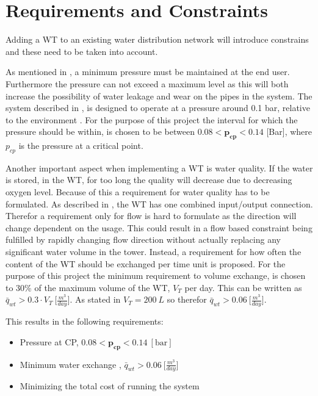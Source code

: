 \chapter{Requirements and Constraints}
\label{Requirements_and_constraints}

Adding a WT to an existing water distribution network will introduce constrains and these need to be taken into account. 

As mentioned in , a minimum pressure must be maintained at the end user. Furthermore the pressure can not exceed a maximum level as this will both increase the possibility of water leakage and wear on the pipes in the system. The system described in , is designed to operate at a pressure around 0.1 bar, relative to the environment \cite{master_aau}. For the purpose of this project the interval for which the pressure should be within, is chosen to be between $0.08 < \pmb{p_{cp}} < 0.14$ [Bar], where $p_{cp}$ is the pressure at a critical point.

Another important aspect when implementing a WT is water quality. If the water is stored, in the WT, for too long the quality will decrease due to decreasing oxygen level. Because of this a requirement for water quality has to be formulated. As described in , the WT has one combined input/output connection. Therefor a requirement only for flow is hard to formulate as the direction will change dependent on the usage. This could result in a flow based constraint being fulfilled by rapidly changing flow direction without actually replacing any significant water volume in the tower. Instead, a requirement for how often the content of the WT should be exchanged per time unit is proposed. For the purpose of this project the minimum requirement to volume exchange, is chosen to 30\% of the maximum volume of the WT, $V_T$ per day. This can be written as $\bar{q}_{wt} > 0.3\cdot V_T \: \big[\frac{m^3}{day}\big]$. As stated in  $V_T = 200 \:L$ so therefor $\bar{q}_{wt} > 0.06 \: \big[\frac{m^3}{day}\big]$.

This results in the following requirements:

\begin{itemize}
	\item Pressure at CP, $0.08 < \pmb{p_{cp}} < 0.14 \:[\text{bar}]$
%
	\item Minimum water exchange , $\bar{q}_{wt} > 0.06 \: \big[\frac{m^3}{day}\big]$
%
	\item Minimizing the total cost of running the system
\end{itemize}